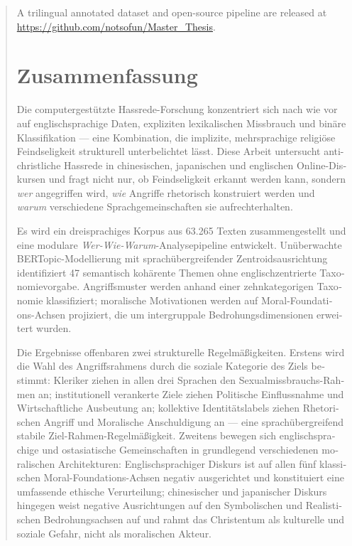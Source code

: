 \documentclass[../CLthesis.tex]{subfiles}
\begin{document}
\begin{abstract}
\begin{otherlanguage}{english}
        A trilingual annotated dataset and open-source pipeline are released at \url{https://github.com/notsofun/Master_Thesis}.

    \end{otherlanguage}
     \newpage \thispagestyle{empty}%

    \begin{otherlanguage}{ngerman}%

        \section*{Zusammenfassung}

        Die computergestützte Hassrede-Forschung konzentriert sich nach wie vor auf englischsprachige Daten, expliziten lexikalischen Missbrauch und binäre Klassifikation --- eine Kombination, die implizite, mehrsprachige religiöse Feindseligkeit strukturell unterbelichtet lässt. Diese Arbeit untersucht anti-christliche Hassrede in chinesischen, japanischen und englischen Online-Diskursen und fragt nicht nur, ob Feindseligkeit erkannt werden kann, sondern \emph{wer} angegriffen wird, \emph{wie} Angriffe rhetorisch konstruiert werden und \emph{warum} verschiedene Sprachgemeinschaften sie aufrechterhalten.

        Es wird ein dreisprachiges Korpus aus 63.265 Texten zusammengestellt und eine modulare \emph{Wer-Wie-Warum}-Analysepipeline entwickelt. Unüberwachte BERTopic-Modellierung mit sprachübergreifender Zentroidsausrichtung identifiziert 47 semantisch kohärente Themen ohne englischzentrierte Taxonomievorgabe. Angriffsmuster werden anhand einer zehnkategorigen Taxonomie klassifiziert; moralische Motivationen werden auf Moral-Foundations-Achsen projiziert, die um intergruppale Bedrohungsdimensionen erweitert wurden.

        Die Ergebnisse offenbaren zwei strukturelle Regelmäßigkeiten. Erstens wird die Wahl des Angriffsrahmens durch die soziale Kategorie des Ziels bestimmt: Kleriker ziehen in allen drei Sprachen den Sexualmissbrauchs-Rahmen an; institutionell verankerte Ziele ziehen Politische Einflussnahme und Wirtschaftliche Ausbeutung an; kollektive Identitätslabels ziehen Rhetorischen Angriff und Moralische Anschuldigung an --- eine sprachübergreifend stabile Ziel-Rahmen-Regelmäßigkeit. Zweitens bewegen sich englischsprachige und ostasiatische Gemeinschaften in grundlegend verschiedenen moralischen Architekturen: Englischsprachiger Diskurs ist auf allen fünf klassischen Moral-Foundations-Achsen negativ ausgerichtet und konstituiert eine umfassende ethische Verurteilung; chinesischer und japanischer Diskurs hingegen weist negative Ausrichtungen auf den Symbolischen und Realistischen Bedrohungsachsen auf und rahmt das Christentum als kulturelle und soziale Gefahr, nicht als moralischen Akteur.


\end{otherlanguage}
\end{abstract}
\end{document}

